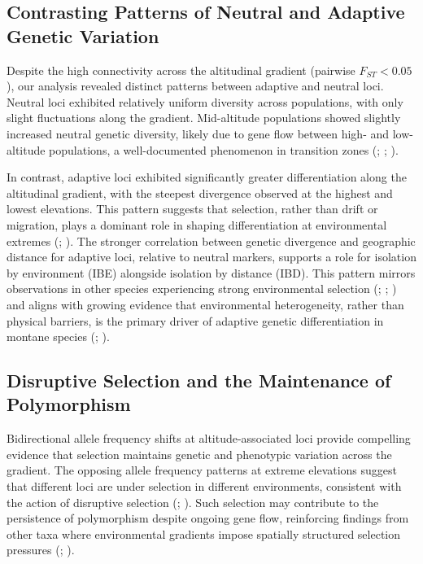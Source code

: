 \documentclass[9pt,a4paper,twoside]{rho-class/rho}
\begin{document}
\subsection{Contrasting Patterns of Neutral and Adaptive Genetic Variation}

Despite the high connectivity across the altitudinal gradient (pairwise $F_{ST}  <0.05$), our analysis revealed distinct patterns between adaptive and neutral loci. Neutral loci exhibited relatively uniform diversity across populations, with only slight fluctuations along the gradient. Mid-altitude populations showed slightly increased neutral genetic diversity, likely due to gene flow between high- and low-altitude populations, a well-documented phenomenon in transition zones (\cite{Byars2009}; \cite{Polato2017}; \cite{Cortázar-Chinarro2017}).

In contrast, adaptive loci exhibited significantly greater differentiation along the altitudinal gradient, with the steepest divergence observed at the highest and lowest elevations. This pattern suggests that selection, rather than drift or migration, plays a dominant role in shaping differentiation at environmental extremes (\cite{Raeymaekers2017}; \cite{Cortázar-Chinarro2017}). The stronger correlation between genetic divergence and geographic distance for adaptive loci, relative to neutral markers, supports a role for isolation by environment (IBE) alongside isolation by distance (IBD). This pattern mirrors observations in other species experiencing strong environmental selection (\cite{Jiang2019}; \cite{Wagutu2022}; \cite{Wakamiya2023}) and aligns with growing evidence that environmental heterogeneity, rather than physical barriers, is the primary driver of adaptive genetic differentiation in montane species (\cite{Zancolli2019}; \cite{Wagutu2022}).

\subsection{Disruptive Selection and the Maintenance of Polymorphism}

Bidirectional allele frequency shifts at altitude-associated loci provide compelling evidence that selection maintains genetic and phenotypic variation across the gradient. The opposing allele frequency patterns at extreme elevations suggest that different loci are under selection in different environments, consistent with the action of disruptive selection (\cite{White2021}; \cite{Wadgymar2022}). Such selection may contribute to the persistence of polymorphism despite ongoing gene flow, reinforcing findings from other taxa where environmental gradients impose spatially structured selection pressures (\cite{Tigano2016}; \cite{Zancolli2019}).
\end{document}
